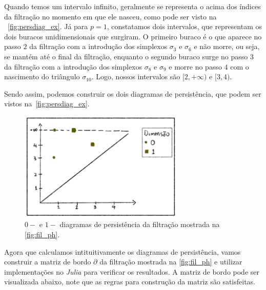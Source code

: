 Quando temos um intervalo infinito, geralmente se representa o acima dos
índices da filtração no momento em que ele nasceu, como pode ser visto na
~\autoref{fig:persdiag_ex}. Já para $p=1$, constatamos dois intervalos,
que representam os dois buracos unidimensionais que surgiram. O primeiro buraco
é o que aparece no passo $2$ da filtração com a introdução dos simplexos
$\sigma_3$ e $\sigma_6$ e não morre, ou seja, se mantém até o final da filtração,
enquanto o segundo buraco surge no passo $3$ da filtração com a introdução
dos simplexos $\sigma_8$ e $\sigma_9$ e morre no passo $4$ com o nascimento
do triângulo $\sigma_{10}$. Logo, nossos intervalos são $[2, +\infty)$ e $[3,4)$.

Sendo assim, podemos construir os dois diagramas de persistência, que podem
ser vistos na~\autoref{fig:persdiag_ex}.
\begin{figure}[!htpb]
  \centering
  \includegraphics[width=0.7\textwidth]{images/persdiag_ex.png}
  \caption{$0-$ e $1-$ diagramas de persistência da filtração mostrada na
  \autoref{fig:fil_ph}.}
  \label{fig:persdiag_ex}
  \fautor
\end{figure}

Agora que calculamos intituitivamente os diagramas de persistência, vamos
construir a matriz de bordo $\partial$ da filtração mostrada na
\autoref{fig:fil_ph} e utilizar implementações no \textit{Julia} para verificar
os resultados. A matriz de bordo pode ser visualizada abaixo, note que as regras
para construção da matriz são satisfeitas.

